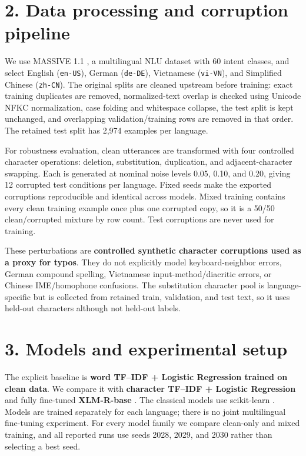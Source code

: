 \documentclass[11pt,a4paper]{article}
\begin{document}
\section*{2. Data processing and corruption pipeline}
We use MASSIVE 1.1 \cite{fitzgerald2023massive,massive_dataset}, a multilingual NLU dataset with 60 intent classes, and select English (\texttt{en-US}), German (\texttt{de-DE}), Vietnamese (\texttt{vi-VN}), and Simplified Chinese (\texttt{zh-CN}). The original splits are cleaned upstream before training: exact training duplicates are removed, normalized-text overlap is checked using Unicode NFKC normalization, case folding and whitespace collapse, the test split is kept unchanged, and overlapping validation/training rows are removed in that order. The retained test split has 2,974 examples per language.

For robustness evaluation, clean utterances are transformed with four controlled character operations: deletion, substitution, duplication, and adjacent-character swapping. Each is generated at nominal noise levels 0.05, 0.10, and 0.20, giving 12 corrupted test conditions per language. Fixed seeds make the exported corruptions reproducible and identical across models. Mixed training contains every clean training example once plus one corrupted copy, so it is a 50/50 clean/corrupted mixture by row count. Test corruptions are never used for training.

These perturbations are \textbf{controlled synthetic character corruptions used as a proxy for typos}. They do not explicitly model keyboard-neighbor errors, German compound spelling, Vietnamese input-method/diacritic errors, or Chinese IME/homophone confusions. The substitution character pool is language-specific but is collected from retained train, validation, and test text, so it uses held-out characters although not held-out labels.

\section*{3. Models and experimental setup}
The explicit baseline is \textbf{word TF--IDF + Logistic Regression trained on clean data}. We compare it with \textbf{character TF--IDF + Logistic Regression} and fully fine-tuned \textbf{XLM-R-base} \cite{conneau2020xlmr}. The classical models use scikit-learn \cite{pedregosa2011scikit}. Models are trained separately for each language; there is no joint multilingual fine-tuning experiment. For every model family we compare clean-only and mixed training, and all reported runs use seeds 2028, 2029, and 2030 rather than selecting a best seed.
\end{document}
